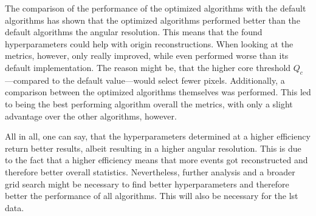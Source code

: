 The comparison of the performance of the optimized algorithms with the default algorithms has shown that
the optimized algorithms performed better than the default algorithms \wrt the angular resolution. This
means that the found hyperparameters could help with origin reconstructions. When looking at the metrics,
however, only \tcc{} really improved, while \fact{} even performed worse than its default implementation.
The reason might be, that the higher core threshold \(Q_c\)---compared to the default value---would
select fewer pixels. Additionally, a comparison between the optimized algorithms themselves was performed. This led to \fact{}
being the best performing algorithm overall \wrt the metrics, with only a slight advantage over the
other algorithms, however.

All in all, one can say, that the hyperparameters determined at a higher efficiency return better results,
albeit resulting in a higher angular resolution. This is due to the fact that a higher efficiency means
that more events got reconstructed and therefore better overall statistics. Nevertheless, further analysis
and a broader grid search might be necessary to find better hyperparameters
and therefore better the performance of all algorithms. This will also be necessary for the \gls{lst} data.

